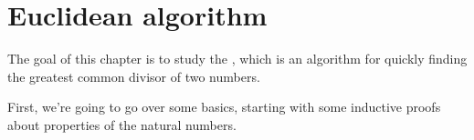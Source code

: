 \chapter{Euclidean algorithm}
\label{ch:euclid}

The goal of this chapter is to study the ,
which is an algorithm for quickly finding the greatest common divisor
of two numbers.

First, we're going to go over some basics, starting with some
inductive proofs about properties of the natural numbers.

